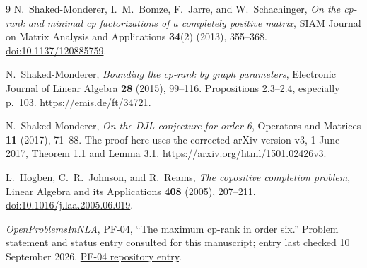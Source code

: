\documentclass[11pt,a4paper]{article}
\theoremstyle{definition}
\begin{document}
\clearpage
\begin{thebibliography}{9}
N.~Shaked-Monderer, I.~M.~Bomze, F.~Jarre, and W.~Schachinger,
\emph{On the cp-rank and minimal cp factorizations of a completely positive matrix},
SIAM Journal on Matrix Analysis and Applications \textbf{34}(2) (2013), 355--368.
\href{https://doi.org/10.1137/120885759}{doi:10.1137/120885759}.

N.~Shaked-Monderer,
\emph{Bounding the cp-rank by graph parameters},
Electronic Journal of Linear Algebra \textbf{28} (2015), 99--116.
Propositions 2.3--2.4, especially p.~103.
\url{https://emis.de/ft/34721}.

N.~Shaked-Monderer,
\emph{On the DJL conjecture for order 6},
Operators and Matrices \textbf{11} (2017), 71--88.
The proof here uses the corrected arXiv version v3, 1 June 2017,
Theorem 1.1 and Lemma 3.1.
\url{https://arxiv.org/html/1501.02426v3}.

L.~Hogben, C.~R.~Johnson, and R.~Reams,
\emph{The copositive completion problem},
Linear Algebra and its Applications \textbf{408} (2005), 207--211.
\href{https://doi.org/10.1016/j.laa.2005.06.019}{doi:10.1016/j.laa.2005.06.019}.

\emph{OpenProblemsInNLA}, PF-04, ``The maximum cp-rank in order six.''
Problem statement and status entry consulted for this manuscript;
entry last checked 10 September 2026.
\href{https://github.com/ajt60gaibb/OpenProblemsInNLA/tree/main/nonnegative-and-positive-factorizations/PF-04}{PF-04 repository entry}.
\end{thebibliography}
\end{document}
